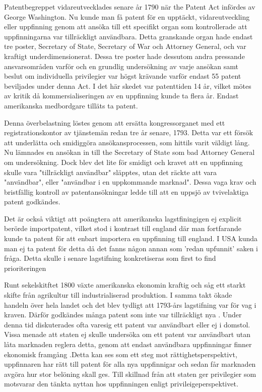 Patentbegreppet vidareutvecklades senare år 1790 när the Patent Act infördes av George Washington. Nu
kunde man få patent för en upptäckt, vidareutveckling eller uppfinning genom att ansöka till ett
specifikt organ som kontrollerade att uppfinningarna var tillräckligt användbara\cite{nard}. Detta
granskande organ hade endast tre poster, Secretary of State, Secretary of War och Attorney General\cite{bracha}, och
var kraftigt underdimensionerat. Dessa tre poster hade dessutom andra pressande ansvarsområden varför
och en grundlig undersökning av varje ansökan samt beslut om individuella privilegier var högst krävande varför endast 55 patent beviljades under denna Act\cite{nard}.  I det här skedet var patenttiden 14 år, vilket
mötes av kritik då kommersialiseringen av en uppfinning kunde ta flera år. Endast amerikanska
medbordgare tilläts ta patent\cite{nard}. 



Denna överbelastning löstes genom att ersätta kongressorganet med ett registrationskontor
av tjänstemän redan tre år senare, 1793. Detta var ett försök att underlätta och smidiggöra
ansökansprocessen, som hittils varit väldigt lång. Nu lämnades en ansökan in till the Secretary of State
som bad Attorney General om undersökning. Dock blev det lite för smidigt och kravet att en uppfinning
skulle vara "tillräckligt användbar" släpptes, utan det räckte att vara "användbar", eller "användbar i
en uppkommande marknad". Dessa vaga krav och bristfällig kontroll av patentansökningar ledde till att en
uppsjö av tvivelaktiga patent godkändes\cite{nard}. 

Det är också viktigt att poängtera att amerikanska lagstfiningigen ej explicit berörde importpatent, vilket stod i kontrast till england där man fortfarande kunde ta patent för att enbart importera en uppfinning till england\cite{bracha}. I USA kunda man ej ta patent för detta då det fanns någon annan som 'redan upfunnit' saken i fråga. Detta skulle i senare lagstifning konkretiseras som first to find prioriteringen

Runt sekelskitftet 1800 växte amerikanska ekonomin kraftig och såg ett starkt skifte från agrikultur
till industrialiserad produktion. I samma takt ökade handeln över hela landet och det blev tydligt att 1793-års lagstifning var för vag i kraven. Därför godkändes många patent som inte var tillräckligt nya \cite{nard}. Under denna tid diskuterades ofta varesig ett patent var användbart eller ej i domstol. Vissa menade att staten ej skulle undersöka om ett patent var användbart utan låta marknaden reglera detta, genom att endast användbara uppfinningar finner ekonomisk framgång \cite{bracha}.Detta kan ses som  ett steg mot rättighetsperspektivt, uppfinnaren har rätt till patent för alla nya uppfinnigar och sedan får marknaden avgöra hur stor belöning skall ges. Till skillnad från att staten ger privilegier som motsvarar den tänkta nyttan hos uppfinningen enligt privileigeperspektivet.

